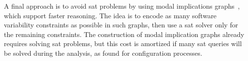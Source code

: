 A final approach is to avoid \ac{sat} problems by using modal implications
graphs~\citep{KTS+:ICSE18}, which support faster reasoning. The idea is to
encode as many software variability constraints as possible in such graphs,
then use a \ac{sat} solver only for the remaining constraints.
%
The construction of modal implication graphs already requires solving \ac{sat}
problems, but this cost is amortized if many \ac{sat} queries will be solved
during the analysis, as \citet{KTS+:ICSE18} found for configuration processes.


